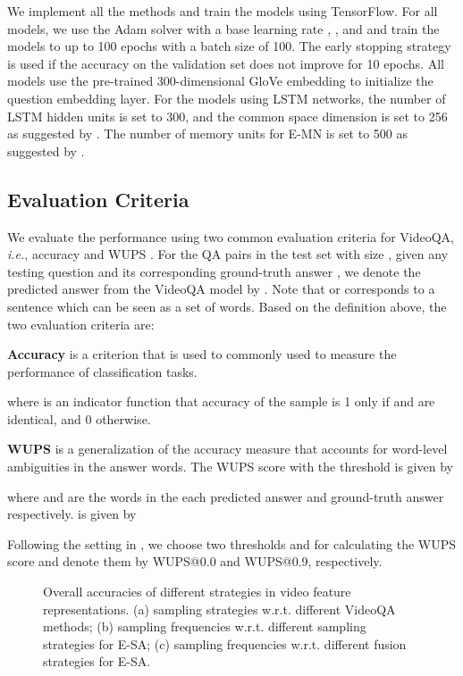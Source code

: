 \documentclass[letterpaper]{article} \usepackage{aaai19}  \usepackage{times}  \usepackage{helvet}  \usepackage{courier}  \usepackage{url}  \usepackage{graphicx}  \usepackage{amsfonts}
\begin{document}
We implement all the methods and train the models using TensorFlow. For all models, we use the Adam solver with a base learning rate , , and  and train the models to up to 100 epochs with a batch size of 100. The early stopping strategy is used if the accuracy on the validation set does not improve for 10 epochs. All models use the pre-trained 300-dimensional GloVe embedding \cite{pennington2014glove} to initialize the question embedding layer. For the models using LSTM networks, the number of LSTM hidden units is set to 300, and the common space dimension is set to 256 as suggested by \cite{xu2017video}. The number of memory units for E-MN is set to 500 as suggested by \cite{zeng2017leveraging}.


\subsection{Evaluation Criteria}
We evaluate the performance using two common evaluation criteria for VideoQA, \emph{i.e.}, accuracy \cite{xu2017video} and WUPS \cite{malinowski2014multi}. For the QA pairs in the test set with size , given any testing question  and its corresponding ground-truth answer , we denote the predicted answer from the VideoQA model by . Note that  or  corresponds to a sentence which can be seen as a set of words. Based on the definition above, the two evaluation criteria are:

\textbf{Accuracy} is a criterion that is used to commonly used to measure the performance of classification tasks.

where  is an indicator function that accuracy of the sample is 1 only if  and  are identical, and 0 otherwise.

\textbf{WUPS} is a generalization of the accuracy measure that accounts for word-level ambiguities in the answer words. The WUPS score with the threshold  is given by
\begin{small}

\end{small}
where  and  are the words in the each predicted answer and ground-truth answer respectively.  is given by

Following the setting in \cite{malinowski2015ask}, we choose two thresholds  and  for calculating the WUPS score and denote them by WUPS@0.0 and WUPS@0.9, respectively.

\begin{figure*}
\centering
{}
\caption{Overall accuracies of different strategies in video feature representations. (a) sampling strategies w.r.t. different VideoQA methods; (b) sampling frequencies w.r.t. different sampling strategies for E-SA; (c) sampling frequencies w.r.t. different fusion strategies for E-SA.}
\label{fig:ablation}
\vspace{-10pt}
\end{figure*}
\end{document}
